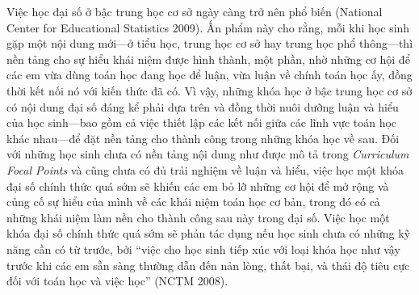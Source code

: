 \documentclass[
  10pt,
  a4paper,
  landscape,
  twoside,
  openany
]{scrbook}
\newcommand{\NOTE}[1]{#1}
\begin{document}
{{Việc học đại số ở bậc trung học cơ sở ngày càng trở nên phổ biến (National Center for Educational Statistics 2009). Ấn phẩm này cho rằng, mỗi khi học sinh gặp một nội dung mới---ở tiểu học, trung học cơ sở hay trung học phổ thông---thì nền tảng cho sự hiểu khái niệm được hình thành, một phần, nhờ những cơ hội để các em vừa dùng toán học đang học để luận, vừa luận về chính toán học ấy, đồng thời kết nối nó với kiến thức đã có. Vì vậy, những khóa học ở bậc trung học cơ sở có nội dung đại số đáng kể phải dựa trên và đồng thời nuôi dưỡng luận và hiểu của học sinh---bao gồm cả việc thiết lập các kết nối giữa các lĩnh vực toán học khác nhau---để đặt nền tảng cho thành công trong những khóa học về sau. Đối với những học sinh chưa có nền tảng nội dung như được mô tả trong \emph{Curriculum Focal Points} và cũng chưa có đủ trải nghiệm về luận và hiểu, việc học một khóa đại số chính thức quá sớm sẽ khiến các em bỏ lỡ những cơ hội để mở rộng và củng cố sự hiểu của mình về các khái niệm toán học cơ bản, trong đó có cả những khái niệm làm nền cho thành công sau này trong đại số. Việc học một khóa đại số chính thức quá sớm sẽ phản tác dụng nếu học sinh chưa có những kỹ năng cần có từ trước, bởi ``việc cho học sinh tiếp xúc với loại khóa học như vậy trước khi các em sẵn sàng thường dẫn đến nản lòng, thất bại, và thái độ tiêu cực đối với toán học và việc học'' (NCTM 2008).}
}
{
\NOTE{}
}
\end{document}
